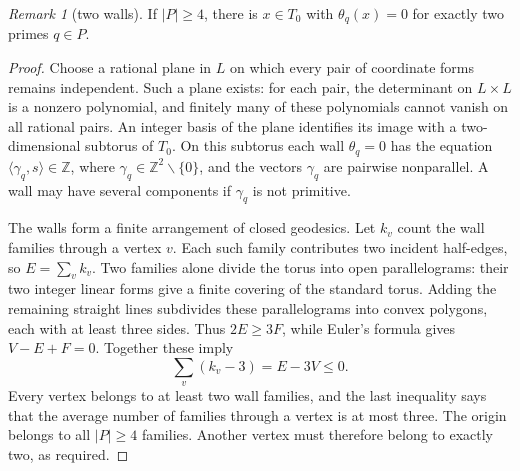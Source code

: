 \documentclass[11pt]{article}
\theoremstyle{remark}
\newtheorem{recordremark}[theorem]{Remark}
\renewenvironment{remark}[1][]{\begin{recordremark}[#1]}{\end{recordremark}}
\theoremstyle{plain}
\begin{document}
\begin{remark}[two walls]\label{long269:res:dp-two-walls}
If $|P|\ge4$, there is $x\in T_0$ with $\theta_q(x)=0$ for exactly two
primes $q\in P$.
\end{remark}
\begin{proof}
Choose a rational plane in $L$ on which every pair of coordinate forms
remains independent. Such a plane exists: for each pair, the determinant
on $L\times L$ is a nonzero polynomial, and finitely many of these
polynomials cannot vanish on all rational pairs. An integer basis of the
plane identifies its image with a two-dimensional subtorus of $T_0$.
On this subtorus each wall $\theta_q=0$ has the equation
$\langle\gamma_q,s\rangle\in\mathbb Z$, where
$\gamma_q\in\mathbb Z^2\smallsetminus\{0\}$, and the vectors $\gamma_q$ are
pairwise nonparallel. A wall may have several components if $\gamma_q$
is not primitive.

The walls form a finite arrangement of closed geodesics. Let $k_v$ count
the wall families through a vertex $v$. Each such family contributes two
incident half-edges, so $E=\sum_v k_v$. Two families alone divide the torus
into open parallelograms: their two integer linear forms give a finite
covering of the standard torus. Adding the remaining straight lines
subdivides these parallelograms into convex polygons, each with at least
three sides. Thus $2E\ge3F$, while Euler's formula gives $V-E+F=0$.
Together these imply
\[
 \sum_v(k_v-3)=E-3V\le0.
\]
Every vertex belongs to at least two wall families, and the last
inequality says that the average number of families through a vertex is
at most three. The origin belongs to all $|P|\ge4$ families. Another
vertex must therefore belong to exactly two, as required.
\end{proof}
\end{document}
